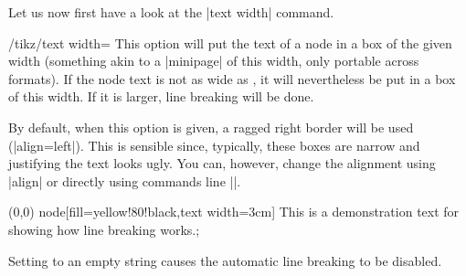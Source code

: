 Let us now first have a look at the |text width| command.
\begin{key}{/tikz/text width=}
  This option will put the text of a node in a box of the given width
  (something akin to a |{minipage}| of this width, only portable
  across formats). If the node text is not as wide as
  , it will nevertheless be put in a box of this
  width. If it is larger, line breaking will be done.

  By default, when this option is given, a ragged right border will be
  used (|align=left|). This is sensible since, typically, these boxes
  are narrow and justifying the text looks ugly. You can, however,
  change the alignment using |align| or directly using commands line
  |\centering|.
\begin{codeexample}[]
\tikz \draw (0,0) node[fill=yellow!80!black,text width=3cm]
  {This is a demonstration text for showing how line breaking works.};
\end{codeexample}
  Setting  to an empty string causes the automatic
  line breaking to be disabled.
\end{key}

